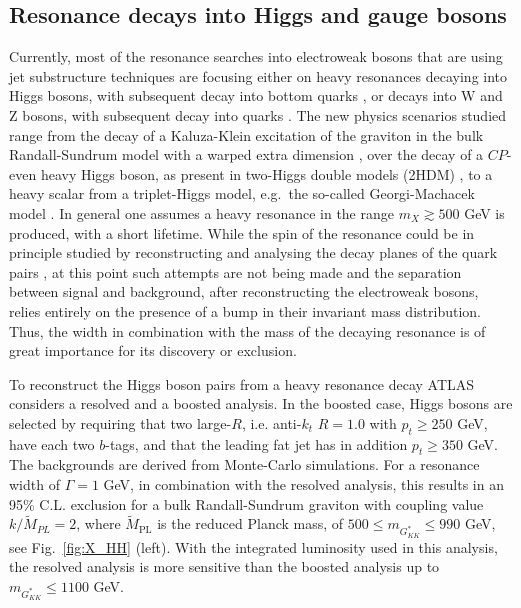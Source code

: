 \subsection{Resonance decays into Higgs and gauge bosons}
Currently, most of the resonance searches into electroweak bosons that are using jet substructure techniques are focusing either on heavy resonances decaying into Higgs bosons, with subsequent decay into bottom quarks \cite{Aad:2015uka, Sirunyan:2017isc, Sirunyan:2018qca}, or decays into W and Z bosons, with subsequent decay into quarks \cite{Aad:2015owa, Khachatryan:2014hpa}.
The new physics scenarios studied range from the decay of a Kaluza-Klein excitation of the graviton in the bulk Randall-Sundrum model with a warped extra dimension \cite{Agashe:2007zd}, over the decay of a $CP$-even heavy Higgs boson, as present in two-Higgs double models (2HDM) \cite{Branco:2011iw}, to a heavy scalar from a triplet-Higgs model, e.g.\ the so-called Georgi-Machacek model \cite{Georgi:1985nv}. In general one assumes a heavy resonance in the range $m_X \gtrsim 500$ GeV is produced, with a short lifetime. While the spin of the resonance could be in principle studied by reconstructing and analysing the decay planes of the quark pairs \cite{Hackstein:2010wk, Englert:2010ud}, at this point such attempts are not being made and the separation between signal and background, after reconstructing the electroweak bosons, relies entirely on the presence of a bump in their invariant mass distribution. Thus, the width in combination with the mass of the decaying resonance is of great importance for its discovery or exclusion.


To reconstruct the Higgs boson pairs from a heavy resonance decay ATLAS \cite{Aad:2015uka, ATLAS:2016ixk} considers a resolved and a boosted analysis. In the boosted case, Higgs bosons are selected by requiring that two large-$R$, i.e. anti-$k_t$ $R=1.0$ with $p_t \geq 250$ GeV, have each two $b$-tags, and that the leading fat jet has in addition $p_t \geq 350$ GeV. The backgrounds are derived from Monte-Carlo simulations. For a resonance width of $\Gamma = 1$ GeV, in combination with the resolved analysis, this results in an 95\% C.L. exclusion for a bulk Randall-Sundrum graviton with coupling value $k/\tilde{M}_{PL}=2$, where $\tilde{M}_{\mathrm{PL}}$ is the reduced Planck mass, of $500 \leq m_{G^*_{KK}} \leq 990$ GeV, see Fig.~\ref{fig:X_HH} (left). With the integrated luminosity used in this analysis, the resolved analysis is more sensitive than the boosted analysis up to $m_{G^*_{KK}} \leq 1100$ GeV.

